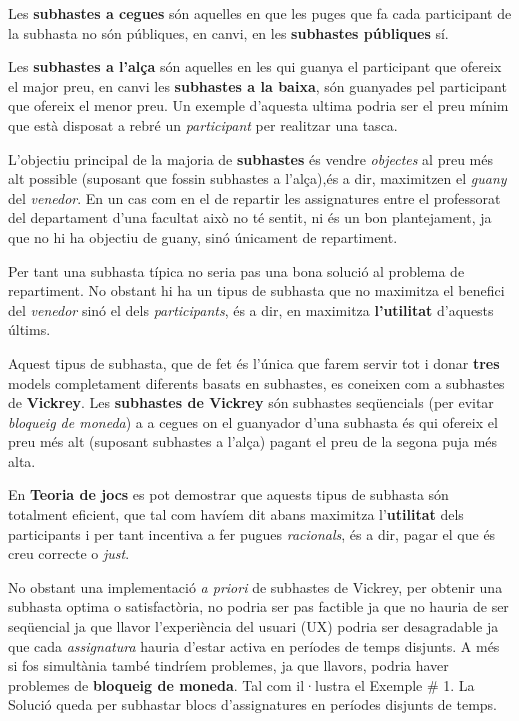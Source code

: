 \documentclass[10pt,twocolumn]{article}
\begin{document}
Les \textbf{subhastes a cegues} són aquelles en que les puges que fa cada participant de la subhasta no són públiques, en canvi, en les \textbf{subhastes públiques} sí.

Les \textbf{subhastes a l'alça} són aquelles en les qui guanya el participant que ofereix el major preu, en canvi les \textbf{subhastes a la baixa}, són guanyades pel participant que  ofereix el menor preu. Un exemple d'aquesta ultima podria ser el preu mínim que està disposat a rebré un \textit{participant} per realitzar una tasca.

L'objectiu principal de la majoria de \textbf{subhastes} és vendre \textit{objectes} al preu més alt possible (suposant que fossin subhastes a l'alça),és a dir, maximitzen el \textit{guany} del \textit{venedor}. En un cas com en el de repartir les assignatures entre el professorat del departament d'una facultat això no té sentit, ni és un bon plantejament, ja que no hi ha objectiu de guany, sinó únicament de repartiment.

Per tant una subhasta típica no seria pas una bona solució al problema de repartiment. No obstant hi ha un tipus de subhasta que no maximitza el benefici del \textit{venedor} sinó el dels \textit{participants}, és a dir, en maximitza \textbf{l'utilitat} d'aquests últims. 

Aquest tipus de subhasta, que de fet és l'única que farem servir tot i donar \textbf{tres} models completament diferents basats en subhastes, es coneixen com a subhastes de \textbf{Vickrey}. Les \textbf{subhastes de Vickrey} són subhastes  seqüencials (per evitar \textit{bloqueig de moneda}) a a cegues on el guanyador d'una subhasta és qui ofereix el preu més alt (suposant subhastes a l'alça) pagant el preu de la segona puja més alta.

En \textbf{Teoria de jocs} es pot demostrar que aquests tipus de subhasta són totalment eficient, que tal com havíem dit abans maximitza l'\textbf{utilitat} dels participants i per tant incentiva a fer pugues \textit{racionals}, és a dir, pagar el que és creu correcte o \textit{just}.   

No obstant una implementació \textit{a priori} de subhastes de Vickrey, per obtenir una subhasta optima o satisfactòria, no podria ser pas factible  ja que no hauria de ser seqüencial ja que llavor l'experiència del usuari (UX) podria ser desagradable ja que cada \textit{assignatura} hauria d'estar activa en períodes de temps disjunts. A més si fos simultània també tindríem problemes, ja que llavors, podria haver problemes de \textbf{bloqueig de moneda}. Tal com il·lustra el Exemple \# 1. La Solució queda per subhastar blocs d'assignatures en períodes disjunts de temps.
\end{document}
